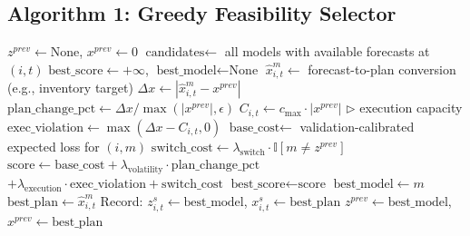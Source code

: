 
\subsection{Algorithm 1: Greedy Feasibility Selector}
\label{algo:greedy-selector}

\begin{algorithm}[H]
\caption{Greedy One-Step Feasibility-Aware Selection}
\label{algo:greedy}
\begin{algorithmic}[1]

    \State $z^{prev} \leftarrow \text{None}$, $x^{prev} \leftarrow 0$
        \State $\text{candidates} \leftarrow$ all models with available forecasts at $(i, t)$
        \State $\text{best\_score} \leftarrow +\infty$, $\text{best\_model} \leftarrow \text{None}$
            \State $\hat{x}_{i,t}^{m} \leftarrow$ forecast-to-plan conversion (e.g., inventory target)
            \State $\Delta x \leftarrow |\hat{x}_{i,t}^{m} - x^{prev}|$
            \State $\text{plan\_change\_pct} \leftarrow \Delta x / \max(|x^{prev}|, \epsilon)$
            \State $C_{i,t} \leftarrow c_{\max} \cdot |x^{prev}|$ \quad $\triangleright$ execution capacity
            \State $\text{exec\_violation} \leftarrow \max(\Delta x - C_{i,t}, 0)$
            \State $\text{base\_cost} \leftarrow$ validation-calibrated expected loss for $(i, m)$
            \State $\text{switch\_cost} \leftarrow \lambda_{\text{switch}} \cdot \mathbb{I}[m \neq z^{prev}]$
            \State $\text{score} \leftarrow \text{base\_cost} + \lambda_{\text{volatility}} \cdot \text{plan\_change\_pct}$
            \State \hspace{1.5em} $+ \lambda_{\text{execution}} \cdot \text{exec\_violation} + \text{switch\_cost}$
                \State $\text{best\_score} \leftarrow \text{score}$
                \State $\text{best\_model} \leftarrow m$
                \State $\text{best\_plan} \leftarrow \hat{x}_{i,t}^{m}$
            \EndIf
        \EndFor
        \State Record: $z_{i,t}^{s} \leftarrow \text{best\_model}$, $x_{i,t}^{s} \leftarrow \text{best\_plan}$
        \State $z^{prev} \leftarrow \text{best\_model}$, $x^{prev} \leftarrow \text{best\_plan}$
    \EndFor
\EndFor
\end{algorithmic}
\end{algorithm}

